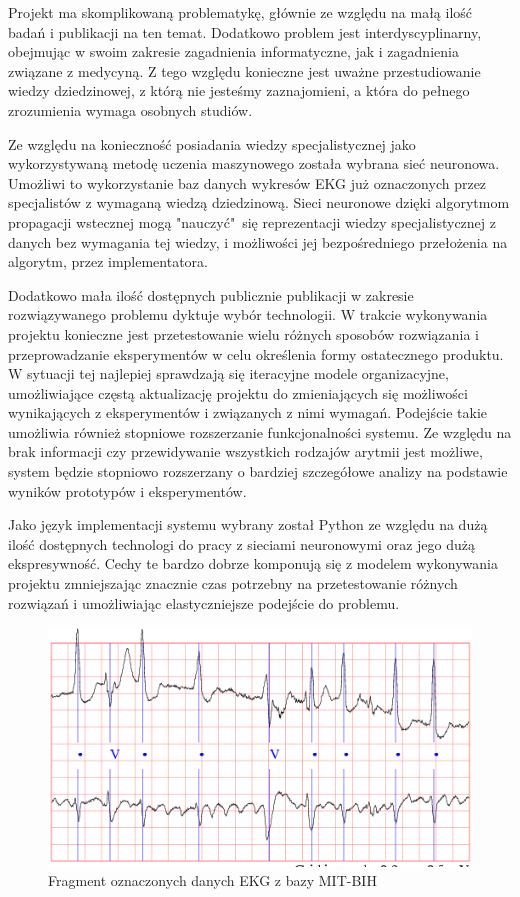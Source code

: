 \documentclass[polish,12pt]{aghthesis}
\begin{document}
Projekt ma skomplikowaną problematykę, głównie ze względu na małą ilość badań i publikacji na ten temat. Dodatkowo problem jest interdyscyplinarny, obejmując w swoim zakresie zagadnienia informatyczne, jak i zagadnienia związane z medycyną. Z tego względu konieczne jest uważne przestudiowanie wiedzy dziedzinowej, z którą nie jesteśmy zaznajomieni, a która do pełnego zrozumienia wymaga osobnych studiów.

Ze względu na konieczność posiadania wiedzy specjalistycznej jako wykorzystywaną metodę uczenia maszynowego została wybrana sieć neuronowa. Umożliwi to wykorzystanie baz danych wykresów EKG już oznaczonych przez specjalistów z wymaganą wiedzą dziedzinową. Sieci neuronowe dzięki algorytmom propagacji wstecznej mogą "nauczyć"\ się reprezentacji wiedzy specjalistycznej z danych bez wymagania tej wiedzy, i możliwości jej bezpośredniego przełożenia na algorytm, przez implementatora.

Dodatkowo mała ilość dostępnych publicznie publikacji w zakresie rozwiązywanego problemu dyktuje wybór technologii. W trakcie wykonywania projektu konieczne jest przetestowanie wielu różnych sposobów rozwiązania i przeprowadzanie eksperymentów w celu określenia formy ostatecznego produktu. W sytuacji tej najlepiej sprawdzają się iteracyjne modele organizacyjne, umożliwiające częstą aktualizację projektu do zmieniających się możliwości wynikających z eksperymentów i związanych z nimi wymagań. Podejście takie umożliwia również stopniowe rozszerzanie funkcjonalności systemu. Ze względu na brak informacji czy przewidywanie wszystkich rodzajów arytmii jest możliwe, system będzie stopniowo rozszerzany o bardziej szczegółowe analizy na podstawie wyników prototypów i eksperymentów.

Jako język implementacji systemu wybrany został Python ze względu na dużą ilość dostępnych technologi do pracy z sieciami neuronowymi oraz jego dużą ekspresywność. Cechy te bardzo dobrze komponują się z modelem wykonywania projektu zmniejszając znacznie czas potrzebny na przetestowanie różnych rozwiązań i umożliwiając elastyczniejsze podejście do problemu.

\begin{figure}[h!]
	\centering
	\includegraphics[width=0.9\linewidth]{mitdb.jpg}
	\caption{Fragment oznaczonych danych EKG z bazy MIT-BIH}
	\label{fig:mitdb}
\end{figure}
\end{document}
